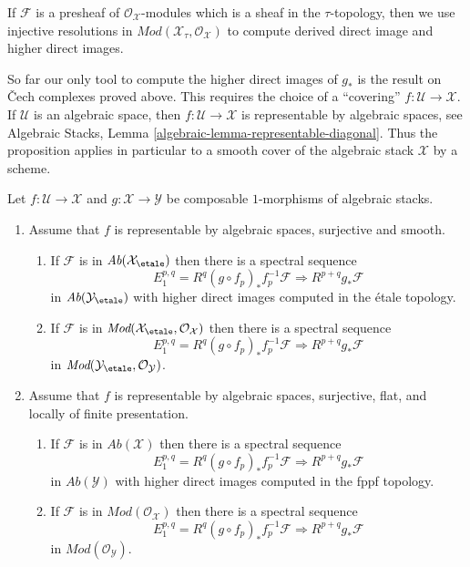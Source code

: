\medskip\noindent
If $\mathcal{F}$ is a presheaf of $\mathcal{O}_\mathcal{X}$-modules
which is a sheaf in the $\tau$-topology, then we use injective
resolutions in $\textit{Mod}(\mathcal{X}_\tau, \mathcal{O}_\mathcal{X})$
to compute derived direct image and higher direct images.

\medskip\noindent
So far our only tool to compute the higher direct images of $g_*$
is the result on {\v C}ech complexes proved above. This requires the choice
of a ``covering'' $f : \mathcal{U} \to \mathcal{X}$. If $\mathcal{U}$
is an algebraic space, then $f : \mathcal{U} \to \mathcal{X}$
is representable by algebraic spaces, see
Algebraic Stacks, Lemma \ref{algebraic-lemma-representable-diagonal}.
Thus the proposition applies in particular to a smooth cover of the
algebraic stack $\mathcal{X}$ by a scheme.

\begin{proposition}
\label{proposition-smooth-covering-compute-direct-image}
Let $f : \mathcal{U} \to \mathcal{X}$ and $g : \mathcal{X} \to \mathcal{Y}$
be composable $1$-morphisms of algebraic stacks.
\begin{enumerate}
\item Assume that $f$ is representable by algebraic spaces, surjective and
smooth.
\begin{enumerate}
\item If $\mathcal{F}$ is in $\textit{Ab}(\mathcal{X}_\etale)$
then there is a spectral sequence
$$
E_1^{p, q} = R^q(g \circ f_p)_*f_p^{-1}\mathcal{F}
\Rightarrow
R^{p + q}g_*\mathcal{F}
$$
in $\textit{Ab}(\mathcal{Y}_\etale)$ with higher direct images
computed in the \'etale topology.
\item If $\mathcal{F}$ is in
$\textit{Mod}(\mathcal{X}_\etale, \mathcal{O}_\mathcal{X})$ then
there is a spectral sequence
$$
E_1^{p, q} = R^q(g \circ f_p)_*f_p^{-1}\mathcal{F}
\Rightarrow
R^{p + q}g_*\mathcal{F}
$$
in $\textit{Mod}(\mathcal{Y}_\etale, \mathcal{O}_\mathcal{Y})$.
\end{enumerate}
\item Assume that $f$ is representable by algebraic spaces, surjective,
flat, and locally of finite presentation.
\begin{enumerate}
\item If $\mathcal{F}$ is in $\textit{Ab}(\mathcal{X})$ then there is
a spectral sequence
$$
E_1^{p, q} = R^q(g \circ f_p)_*f_p^{-1}\mathcal{F}
\Rightarrow
R^{p + q}g_*\mathcal{F}
$$
in $\textit{Ab}(\mathcal{Y})$ with higher direct images
computed in the fppf topology.
\item If $\mathcal{F}$ is in $\textit{Mod}(\mathcal{O}_\mathcal{X})$ then
there is a spectral sequence
$$
E_1^{p, q} = R^q(g \circ f_p)_*f_p^{-1}\mathcal{F}
\Rightarrow
R^{p + q}g_*\mathcal{F}
$$
in $\textit{Mod}(\mathcal{O}_\mathcal{Y})$.
\end{enumerate}
\end{enumerate}
\end{proposition}

